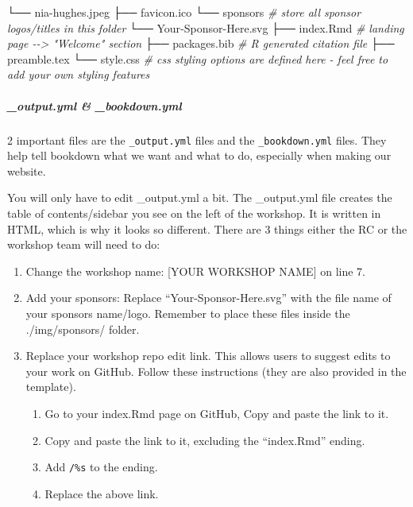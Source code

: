 \documentclass[
]{book}
\newenvironment{Shaded}{\begin{snugshade}}{\end{snugshade}}
\newcommand{\CommentTok}[1]{\textcolor[rgb]{0.56,0.35,0.01}{\textit{#1}}}
\newcommand{\ExtensionTok}[1]{#1}
\newcommand{\NormalTok}[1]{#1}
\providecommand{\tightlist}{%
  \setlength{\itemsep}{0pt}\setlength{\parskip}{0pt}}
\theoremstyle{definition}
\theoremstyle{definition}
\theoremstyle{definition}
\theoremstyle{definition}
\theoremstyle{remark}
\begin{document}
\begin{Shaded}
\begin{Highlighting}[]
        \ExtensionTok{└──}\NormalTok{ nia{-}hughes.jpeg}
    \ExtensionTok{├──}\NormalTok{ favicon.ico}
    \ExtensionTok{└──}\NormalTok{ sponsors }\CommentTok{\# store all sponsor logos/titles in this folder}
         \ExtensionTok{└──}\NormalTok{ Your{-}Sponsor{-}Here.svg}
\ExtensionTok{├──}\NormalTok{ index.Rmd }\CommentTok{\# landing page {-}{-}\textgreater{} "Welcome" section}
\ExtensionTok{├──}\NormalTok{ packages.bib }\CommentTok{\# R generated citation file}
\ExtensionTok{├──}\NormalTok{ preamble.tex}
\ExtensionTok{└──}\NormalTok{ style.css }\CommentTok{\# css styling options are defined here {-} feel free to add your own styling features}
\end{Highlighting}
\end{Shaded}

\subparagraph*{\texorpdfstring{ \_output.yml \& \_bookdown.yml }{ \_output.yml \& \_bookdown.yml }}\label{output.yml-_bookdown.yml}

2 important files are the \texttt{\_output.yml} files and the \texttt{\_bookdown.yml} files. They help tell bookdown what we want and what to do, especially when making our website.

You will only have to edit \_output.yml a bit. The \_output.yml file creates the table of contents/sidebar you see on the left of the workshop. It is written in HTML, which is why it looks so different. There are 3 things either the RC or the workshop team will need to do:

\begin{enumerate}
\def\labelenumi{\arabic{enumi}.}
\item
  Change the workshop name: {[}YOUR WORKSHOP NAME{]} on line 7.
\item
  Add your sponsors: Replace ``Your-Sponsor-Here.svg'' with the file name of your sponsors name/logo. Remember to place these files inside the ./img/sponsors/ folder.
\item
  Replace your workshop repo edit link. This allows users to suggest edits to your work on GitHub. Follow these instructions (they are also provided in the template).

  \begin{enumerate}
  \def\labelenumii{\arabic{enumii}.}
  \tightlist
  \item
    Go to your index.Rmd page on GitHub, Copy and paste the link to it.
  \item
    Copy and paste the link to it, excluding the ``index.Rmd'' ending.
  \item
    Add \texttt{/\%s} to the ending.
  \item
    Replace the above link.
  \end{enumerate}
\end{enumerate}
\end{document}
